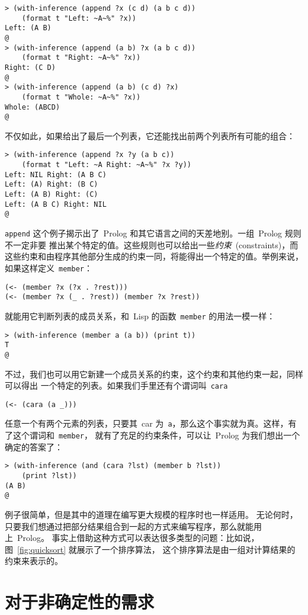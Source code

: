 \begin{lstlisting}
> (with-inference (append ?x (c d) (a b c d))
    (format t "Left: ~A~%" ?x))
Left: (A B)
@
> (with-inference (append (a b) ?x (a b c d))
    (format t "Right: ~A~%" ?x))
Right: (C D)
@
> (with-inference (append (a b) (c d) ?x)
    (format t "Whole: ~A~%" ?x))
Whole: (ABCD)
@
\end{lstlisting}
不仅如此，如果给出了最后一个列表，它还能找出前两个列表所有可能的组合：
\begin{lstlisting}
> (with-inference (append ?x ?y (a b c))
    (format t "Left: ~A Right: ~A~%" ?x ?y))
Left: NIL Right: (A B C)
Left: (A) Right: (B C)
Left: (A B) Right: (C)
Left: (A B C) Right: NIL
@
\end{lstlisting}
\verb|append| 这个例子揭示出了~Prolog 和其它语言之间的天差地别。一组~Prolog 规则不一定非要
推出某个特定的值。这些规则也可以给出一些\emph{约束}~(constraints)，而
这些约束和由程序其他部分生成的约束一同，将能得出一个特定的值。举例来说，如果这样定义~\verb|member|：
\begin{lstlisting}
(<- (member ?x (?x . ?rest)))
(<- (member ?x (_ . ?rest)) (member ?x ?rest))
\end{lstlisting}
就能用它判断列表的成员关系，和~Lisp 的函数~\verb|member| 的用法一模一样：
\begin{lstlisting}
> (with-inference (member a (a b)) (print t))
T
@
\end{lstlisting}
不过，我们也可以用它新建一个成员关系的约束，这个约束和其他约束一起，同样可以得出
一个特定的列表。如果我们手里还有个谓词叫~\verb|cara|
\begin{lstlisting}
(<- (cara (a _)))
\end{lstlisting}
任意一个有两个元素的列表，只要其~car 为~\verb|a|，那么这个事实就为真。这样，有了这个谓词和~\verb|member|，
就有了充足的约束条件，可以让~Prolog 为我们想出一个确定的答案了：
\begin{lstlisting}
> (with-inference (and (cara ?lst) (member b ?lst))
    (print ?lst))
(A B)
@
\end{lstlisting}

例子很简单，但是其中的道理在编写更大规模的程序时也一样适用。
无论何时，只要我们想通过把部分结果组合到一起的方式来编写程序，那么就能用上~Prolog。
事实上借助这种方式可以表达很多类型的问题：比如说，图~\ref{fig:quicksort} 就展示了一个排序算法，
这个排序算法是由一组对计算结果的约束来表示的。

\section{对于非确定性的需求}
\label{sec:the_need_for_nodeterminism}

